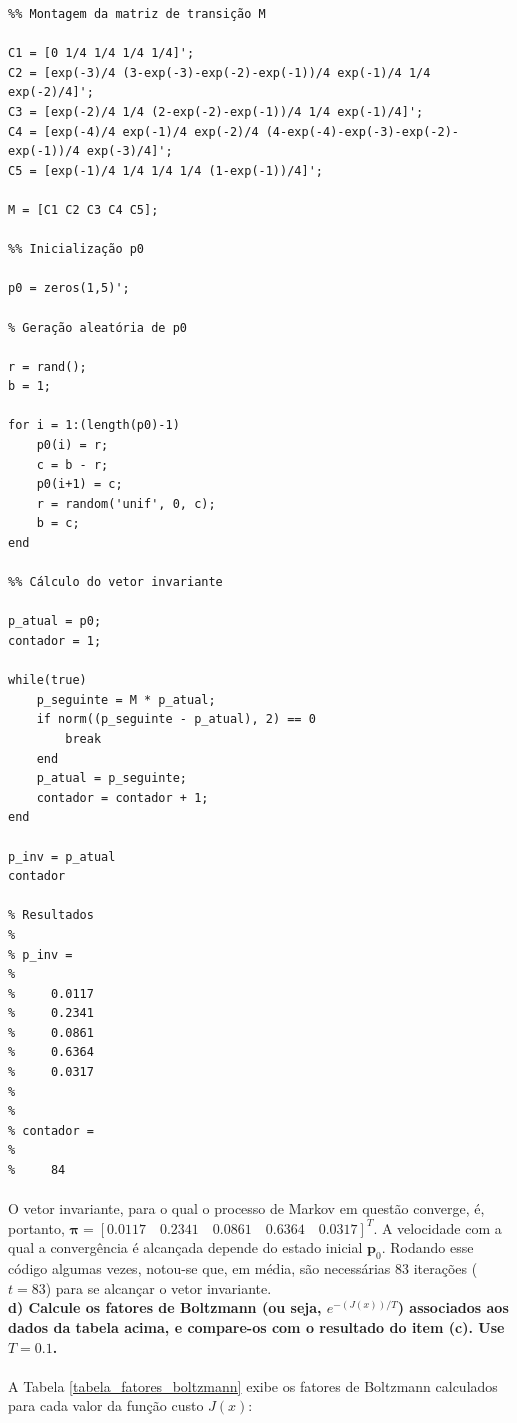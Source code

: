 \documentclass{report}
\begin{document}
\begin{lstlisting}
%% Montagem da matriz de transição M

C1 = [0 1/4 1/4 1/4 1/4]';
C2 = [exp(-3)/4 (3-exp(-3)-exp(-2)-exp(-1))/4 exp(-1)/4 1/4 exp(-2)/4]';
C3 = [exp(-2)/4 1/4 (2-exp(-2)-exp(-1))/4 1/4 exp(-1)/4]';
C4 = [exp(-4)/4 exp(-1)/4 exp(-2)/4 (4-exp(-4)-exp(-3)-exp(-2)-exp(-1))/4 exp(-3)/4]';
C5 = [exp(-1)/4 1/4 1/4 1/4 (1-exp(-1))/4]';

M = [C1 C2 C3 C4 C5];

%% Inicialização p0

p0 = zeros(1,5)';

% Geração aleatória de p0

r = rand();
b = 1;

for i = 1:(length(p0)-1)
    p0(i) = r;
    c = b - r;
    p0(i+1) = c;
    r = random('unif', 0, c);
    b = c;
end

%% Cálculo do vetor invariante

p_atual = p0;
contador = 1;

while(true)
    p_seguinte = M * p_atual;
    if norm((p_seguinte - p_atual), 2) == 0
        break
    end
    p_atual = p_seguinte;
    contador = contador + 1;
end

p_inv = p_atual
contador

% Resultados
% 
% p_inv =
% 
%     0.0117
%     0.2341
%     0.0861
%     0.6364
%     0.0317
% 
% 
% contador =
% 
%     84
\end{lstlisting}

\paragraph{} O vetor invariante, para o qual o processo de Markov em questão converge, é, portanto, $\boldsymbol{\pi} = [0.0117 \quad 0.2341 \quad 0.0861 \quad 0.6364 \quad 0.0317]^T$. A velocidade com a qual a convergência é alcançada depende do estado inicial $\mathbf{p}_0$. Rodando esse código algumas vezes, notou-se que, em média, são necessárias 83 iterações ($t = 83$) para se alcançar o vetor invariante.\\

\textbf{d) Calcule os fatores de Boltzmann (ou seja, $e^{-(J(x))/T}$) associados aos dados da tabela acima, e compare-os com o resultado do item (c). Use $T = 0.1$.}\\

\paragraph{} A Tabela \ref{tabela_fatores_boltzmann} exibe os fatores de Boltzmann calculados para cada valor da função custo $J(x)$:\\
\end{document}
